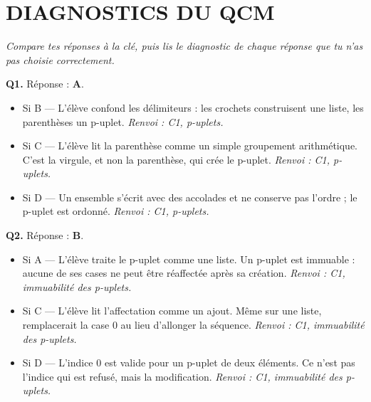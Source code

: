 
\section*{\textcolor{chapcolor}{\MakeUppercase{Diagnostics du QCM}}}

\textit{Compare tes réponses à la clé, puis lis le diagnostic de chaque réponse que tu n'as pas choisie correctement.}

\textbf{Q1.} Réponse : \textbf{A}.
\begin{itemize}[nosep]
  \item Si B — L'élève confond les délimiteurs : les crochets construisent une liste, les parenthèses un p-uplet. \emph{Renvoi : C1, p-uplets.}
  \item Si C — L'élève lit la parenthèse comme un simple groupement arithmétique. C'est la virgule, et non la parenthèse, qui crée le p-uplet. \emph{Renvoi : C1, p-uplets.}
  \item Si D — Un ensemble s'écrit avec des accolades et ne conserve pas l'ordre ; le p-uplet est ordonné. \emph{Renvoi : C1, p-uplets.}
\end{itemize}

\textbf{Q2.} Réponse : \textbf{B}.
\begin{itemize}[nosep]
  \item Si A — L'élève traite le p-uplet comme une liste. Un p-uplet est immuable : aucune de ses cases ne peut être réaffectée après sa création. \emph{Renvoi : C1, immuabilité des p-uplets.}
  \item Si C — L'élève lit l'affectation comme un ajout. Même sur une liste,  remplacerait la case $0$ au lieu d'allonger la séquence. \emph{Renvoi : C1, immuabilité des p-uplets.}
  \item Si D — L'indice $0$ est valide pour un p-uplet de deux éléments. Ce n'est pas l'indice qui est refusé, mais la modification. \emph{Renvoi : C1, immuabilité des p-uplets.}
\end{itemize}

